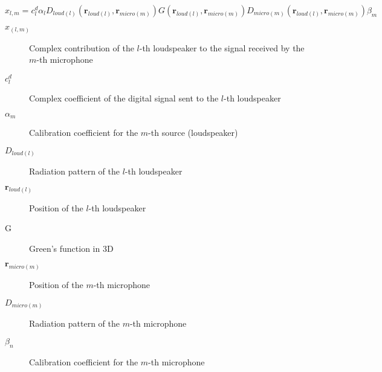 %

\begin{equation}
x_{l,m} = c_{l}^d \alpha_l D_{loud(l)}(\mathbf{r}_{loud(l)}, \mathbf{r}_{micro(m)}) G(\mathbf{r}_{loud(l)}, \mathbf{r}_{micro(m)}) D_{micro(m)}(\mathbf{r}_{loud(l)}, \mathbf{r}_{micro(m)}) \beta_m
\label{transEquationCalibration}
\end{equation}

\begin{description}
	\item[$x_{(l,m)}$] Complex contribution of the $l$-th loudspeaker to the signal received by the $m$-th microphone
	\item[$c_{l}^d$] Complex coefficient of the digital signal sent to the $l$-th loudspeaker
	\item[$\alpha_m$] Calibration coefficient for the $m$-th source (loudspeaker)
	\item[$D_{loud(l)}$] Radiation pattern of the $l$-th loudspeaker
	\item[$\mathbf{r}_{loud(l)}$] Position of the $l$-th loudspeaker
	\item[G] Green's function in 3D
	\item[$\mathbf{r}_{micro(m)}$] Position of the $m$-th microphone
	\item[$D_{micro(m)}$] Radiation pattern of the $m$-th microphone
	\item[$\beta_n$] Calibration coefficient for the $m$-th microphone
\end{description}
